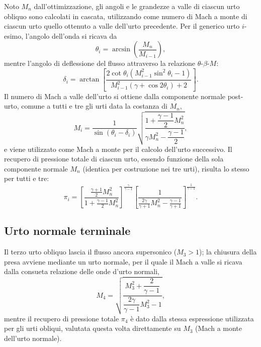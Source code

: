 Noto $M_n$ dall'ottimizzazione, gli angoli e le grandezze a valle di ciascun urto obliquo sono calcolati in cascata, utilizzando come numero di Mach a monte di ciascun urto quello ottenuto a valle dell'urto precedente. Per il generico urto $i$-esimo, l'angolo dell'onda si ricava da
\begin{equation*}
    \theta_i = \arcsin\!\left(\frac{M_n}{M_{i-1}}\right),
\end{equation*}
mentre l'angolo di deflessione del flusso attraverso la relazione $\theta$-$\beta$-$M$:
\begin{equation*}
    \delta_i = \arctan\!\left[\frac{2\cot\theta_i\left(M_{i-1}^2\sin^2\theta_i - 1\right)}{M_{i-1}^2(\gamma+\cos 2\theta_i)+2}\right].
\end{equation*}
Il numero di Mach a valle dell'urto si ottiene dalla componente normale post-urto, comune a tutti e tre gli urti data la costanza di $M_n$,
\begin{equation*}
    M_i = \frac{1}{\sin(\theta_i-\delta_i)}\sqrt{\frac{1+\dfrac{\gamma-1}{2}M_n^2}{\gamma M_n^2 - \dfrac{\gamma-1}{2}}},
\end{equation*}
e viene utilizzato come Mach a monte per il calcolo dell'urto successivo. Il recupero di pressione totale di ciascun urto, essendo funzione della sola componente normale $M_n$ (identica per costruzione nei tre urti), risulta lo stesso per tutti e tre:
\begin{equation*}
    \pi_i = \left[\frac{\frac{\gamma+1}{2}M_n^2}{1+\frac{\gamma-1}{2}M_n^2}\right]^{\frac{\gamma}{\gamma-1}} \left[\frac{1}{\frac{2\gamma}{\gamma+1}M_n^2 - \frac{\gamma-1}{\gamma+1}}\right]^{\frac{1}{\gamma-1}}.
\end{equation*}

\subsection{Urto normale terminale}

Il terzo urto obliquo lascia il flusso ancora supersonico ($M_3>1$); la chiusura della presa avviene mediante un urto normale, per il quale il Mach a valle si ricava dalla consueta relazione delle onde d'urto normali,
\begin{equation*}
    M_4 = \sqrt{\frac{M_3^2 + \dfrac{2}{\gamma-1}}{\dfrac{2\gamma}{\gamma-1}M_3^2 - 1}},
\end{equation*}
mentre il recupero di pressione totale $\pi_4$ è dato dalla stessa espressione utilizzata per gli urti obliqui, valutata questa volta direttamente su $M_3$ (Mach a monte dell'urto normale).

